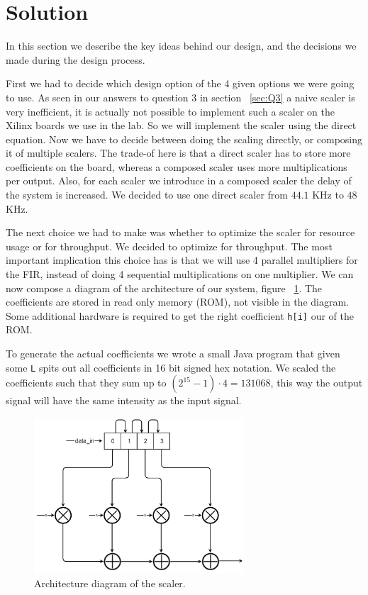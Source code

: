 \section{Solution}
In this section we describe the key ideas behind our design, and the decisions we made during the design process.

First we had to decide which design option of the 4 given options we were going to use. As seen in our answers to question 3 in section ~\ref{sec:Q3} a naive scaler is very inefficient, it is actually not possible to implement such a scaler on the Xilinx boards we use in the lab. So we will implement the scaler using the direct equation. Now we have to decide between doing the scaling directly, or composing it of multiple scalers. The trade-of here is that a direct scaler has to store more coefficients on the board, whereas a composed scaler uses more multiplications per output. Also, for each scaler we introduce in a composed scaler the delay of the system is increased. We decided to use one direct scaler from $44.1$ KHz to $48$ KHz.

The next choice we had to make was whether to optimize the scaler for resource usage or for throughput. We decided to optimize for throughput. The most important implication this choice has is that we will use 4 parallel multipliers for the FIR, instead of doing 4 sequential multiplications on one multiplier. We can now compose a diagram of the architecture of our system, figure ~\ref{fig:arch}. The coefficients are stored in read only memory (ROM), not visible in the diagram. Some additional hardware is required to get the right coefficient \texttt{h[i]} our of the ROM.

To generate the actual coefficients we wrote a small Java program that given some \texttt{L} spits out all coefficients  in 16 bit signed hex notation. We scaled the coefficients such that they sum up to $(2^{15}-1)\cdot 4 = 131068$, this way the output signal will have the same intensity as the input signal.

\begin{figure}
\begin{center}
\includegraphics[width=0.7\textwidth]{images/architecture.png}
\caption{Architecture diagram of the scaler.}
\label{fig:arch}
\end{center}
\end{figure}

